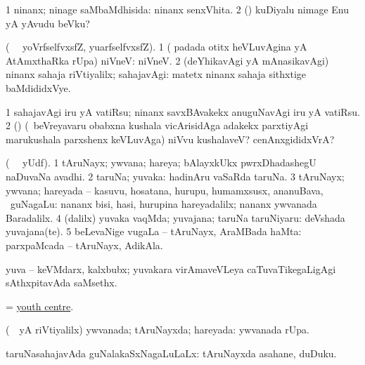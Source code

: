 \noindent
\gl{\pagu} 
\bmng
\bnum
\num{1}  ninanx; ninage saMbaMdhisida:  ninanx senxVhita. 
\num{2}  (\AmA) kuDiyalu nimage Enu yA yAvudu beVku?
\enum
\emng
\eentry



\bentry
{} 
\gl{\sanA} 
\bmng
(\bava\  \ucAcx\ yoVrfselfvxsfZ, yuarfselfvxsfZ). 
\bnum
\num{1} ( padada otitx heVLuvAgina yA AtAmxthaRka rUpa) niVneV:  niVneV. 
\num{2} (deYhikavAgi yA mAnasikavAgi) ninanx sahaja riVtiyalilx; sahajavAgi:  matetx ninanx sahaja sithxtige baMdididxVye.
\enum
\emng         

\noindent
\gl{\pagu} 
\bmng
\bnum
\num{1}  sahajavAgi iru yA vatiRsu; ninanx  savxBAvakekx anuguNavAgi iru yA vatiRsu. 
\num{2}  (\ashi) (\kanmu\ beVreyavaru obabxna kushala vicArisidAga adakekx parxtiyAgi marukushala parxshenx keVLuvAga) niVvu kushalaveV? cenAnxgididxVrA?
\enum
\emng
\eentry

\bentry
{} 
\gl{\nA} 
\bmng
(\bava\  \ucAcx\ yUdf). 
\bnum
\num{1} tAruNayx; ywvana; hareya; bAlayxkUkx pwrxDhadashegU naDuvaNa avadhi. 
\num{2} taruNa; yuvaka:  hadinAru vaSaRda taruNa. 
\num{3} tAruNayx; ywvana; hareyada -- kasuvu, hosatana, hurupu, humamxsusx, ananuBava, \mo\ guNagaLu:  nananx bisi, hasi, hurupina hareyadalilx; nananx ywvanada Baradalilx.  
\num{4} (\bava dalilx) yuvaka vaqMda; yuvajana; taruNa taruNiyaru:  deVshada yuvajana(te). 
\num{5} beLevaNige \mo vugaLa -- tAruNayx, AraMBada haMta:  parxpaMcada -- tAruNayx, AdikAla.
\enum
\emng
\eentry

\bentry
{}
\gl{\nA}
\bmng
yuva -- keVMdarx, kalxbubx; yuvakara virAmaveVLeya caTuvaTikegaLigAgi sAthxpitavAda saMsethx.
\emng
\eentry

\bentry
{}
\gl{\nA} 
\bmng
= \hyperlink{youth centre}{youth centre}.
\emng
\eentry

\bentry
{} 
\gl{\gu} 
\bmng
(\kanmu\ \rUpa\ yA riVtiyalilx) 
\banum
{} ywvanada; tAruNayxda; hareyada:  ywvanada rUpa. 

 taruNasahajavAda guNalakaSxNagaLuLaLx:  tAruNayxda asahane, duDuku. 


